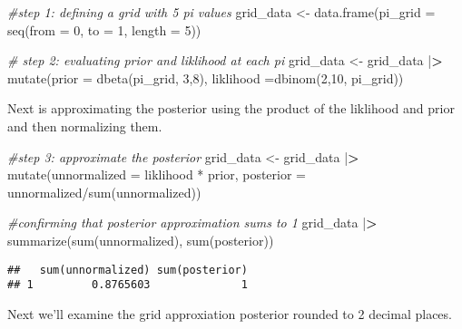 \documentclass[
]{article}
\newenvironment{Shaded}{\begin{snugshade}}{\end{snugshade}}
\newcommand{\AttributeTok}[1]{\textcolor[rgb]{0.77,0.63,0.00}{#1}}
\newcommand{\CommentTok}[1]{\textcolor[rgb]{0.56,0.35,0.01}{\textit{#1}}}
\newcommand{\DecValTok}[1]{\textcolor[rgb]{0.00,0.00,0.81}{#1}}
\newcommand{\ErrorTok}[1]{\textcolor[rgb]{0.64,0.00,0.00}{\textbf{#1}}}
\newcommand{\FunctionTok}[1]{\textcolor[rgb]{0.00,0.00,0.00}{#1}}
\newcommand{\NormalTok}[1]{#1}
\newcommand{\OtherTok}[1]{\textcolor[rgb]{0.56,0.35,0.01}{#1}}
\newcommand{\SpecialCharTok}[1]{\textcolor[rgb]{0.00,0.00,0.00}{#1}}
\begin{document}
\begin{Shaded}
\begin{Highlighting}[]
\CommentTok{\#step 1: defining a grid with 5 pi values }
\NormalTok{grid\_data }\OtherTok{\textless{}{-}} \FunctionTok{data.frame}\NormalTok{(}\AttributeTok{pi\_grid =} \FunctionTok{seq}\NormalTok{(}\AttributeTok{from =} \DecValTok{0}\NormalTok{, }\AttributeTok{to =} \DecValTok{1}\NormalTok{, }\AttributeTok{length =} \DecValTok{5}\NormalTok{))}

\CommentTok{\# step 2: evaluating prior and liklihood at each pi}
\NormalTok{grid\_data }\OtherTok{\textless{}{-}}\NormalTok{ grid\_data }\SpecialCharTok{|}\ErrorTok{\textgreater{}} 
  \FunctionTok{mutate}\NormalTok{(}\AttributeTok{prior =} \FunctionTok{dbeta}\NormalTok{(pi\_grid, }\DecValTok{3}\NormalTok{,}\DecValTok{8}\NormalTok{), }
         \AttributeTok{liklihood =}\FunctionTok{dbinom}\NormalTok{(}\DecValTok{2}\NormalTok{,}\DecValTok{10}\NormalTok{, pi\_grid))}
\end{Highlighting}
\end{Shaded}

Next is approximating the posterior using the product of the liklihood
and prior and then normalizing them.

\begin{Shaded}
\begin{Highlighting}[]
\CommentTok{\#step 3: approximate the posterior}
\NormalTok{grid\_data }\OtherTok{\textless{}{-}}\NormalTok{ grid\_data }\SpecialCharTok{|}\ErrorTok{\textgreater{}} 
  \FunctionTok{mutate}\NormalTok{(}\AttributeTok{unnormalized =}\NormalTok{ liklihood }\SpecialCharTok{*}\NormalTok{ prior, }
         \AttributeTok{posterior =}\NormalTok{ unnormalized}\SpecialCharTok{/}\FunctionTok{sum}\NormalTok{(unnormalized))}

\CommentTok{\#confirming that posterior approximation sums to 1}
\NormalTok{grid\_data }\SpecialCharTok{|}\ErrorTok{\textgreater{}} \FunctionTok{summarize}\NormalTok{(}\FunctionTok{sum}\NormalTok{(unnormalized), }\FunctionTok{sum}\NormalTok{(posterior))}
\end{Highlighting}
\end{Shaded}

\begin{verbatim}
##   sum(unnormalized) sum(posterior)
## 1         0.8765603              1
\end{verbatim}

Next we'll examine the grid approxiation posterior rounded to 2 decimal
places.
\end{document}
